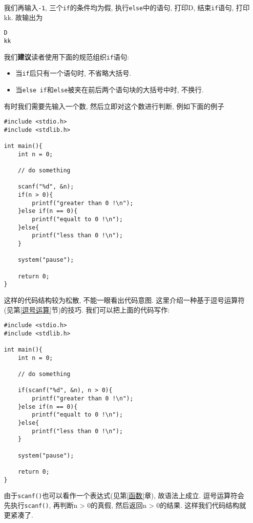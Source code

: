             我们再输入\texttt{-1}, 三个\texttt{if}的条件均为假, 执行\texttt{else}中的语句, 打印D, 结束\texttt{if}语句, 打印kk. 故输出为
\begin{lstlisting}
D
kk
\end{lstlisting}

            我们\textbf{建议}读者使用下面的规范组织\texttt{if}语句:
            \begin{itemize}
                \item 当\texttt{if}后只有一个语句时, 不省略大括号.
                \item 当\texttt{else if}和\texttt{else}被夹在前后两个语句块的大括号中时, 不换行.
            \end{itemize}

            \begin{mdframed}[linecolor=darkgray]
            有时我们需要先输入一个数, 然后立即对这个数进行判断, 例如下面的例子
\begin{lstlisting}
#include <stdio.h>
#include <stdlib.h>

int main(){
    int n = 0;

    // do something

    scanf("%d", &n);
    if(n > 0){
        printf("greater than 0 !\n");
    }else if(n == 0){
        printf("equalt to 0 !\n");
    }else{
        printf("less than 0 !\n");
    }

    system("pause");

    return 0;
}
\end{lstlisting}

            这样的代码结构较为松散, 不能一眼看出代码意图. 这里介绍一种基于逗号运算符(见第\ref{逗号运算}节)的技巧. 我们可以把上面的代码写作:
\begin{lstlisting}
#include <stdio.h>
#include <stdlib.h>

int main(){
    int n = 0;

    // do something

    if(scanf("%d", &n), n > 0){
        printf("greater than 0 !\n");
    }else if(n == 0){
        printf("equalt to 0 !\n");
    }else{
        printf("less than 0 !\n");
    }

    system("pause");

    return 0;
}
\end{lstlisting}

            由于\texttt{scanf()}也可以看作一个表达式(见第\ref{函数}章), 故语法上成立. 逗号运算符会先执行\texttt{scanf()}, 再判断n > 0的真假, 然后返回n > 0的结果. 这样我们代码结构就更紧凑了.
            \end{mdframed}


